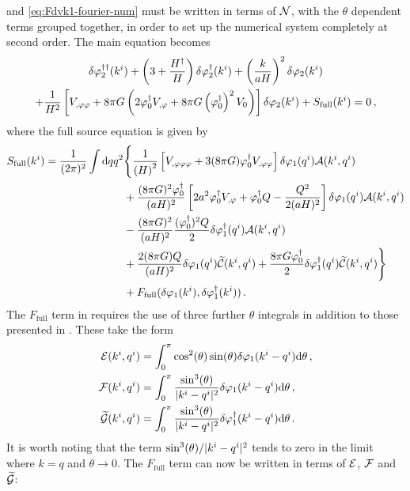  and \eqref{eq:Fdvk1-fourier-num} must be written in
terms of $\mathcal{N}$, with the $\theta$ dependent terms grouped together, in order to set
up the numerical system completely at second order. 
The main equation
becomes
\begin{multline}
 \label{eq:fullso-res}
\ddN{\dvp2}(\kvi) + \left(3 + \frac{\dN{H}}{H}\right) \dN{\dvp2}(\kvi) +
\left(\frac{k}{aH}\right)^2 \dvp2(\kvi) \\
% 
+ \frac{1}{H^2}\left[ \Upp + 8\pi G\left(2\dN{\vp_0}\Uphi + 8\pi G
\left(\dN{\vp_0}\right)^2 \U \right)\right] \dvp2(\kvi)
% 
+ S_\mathrm{full}(\kvi) = 0\,,
\end{multline}
% 
where the full source equation is given by
% 
\begin{align}
\label{eq:fullsrc-res}
S_\mathrm{full}(\kvi) = \frac{1}{(2\pi)^2}\int \d q q^2 &\Bigg\{ 
% 
\frac{1}{\left(H\right)^2} \left[ \Uppp + 3(8\pi G)\dN{\vp_0}\Upp\right]
 \dvp1(\qvi) \A(\kvi, \qvi) \nonumber \\
% 
&+\frac{(8\pi G)^2 \dN{\vp_0}}{(aH)^2}\left[ 2a^2\dN{\vp_0}\Uphi +\dN{\vp_0}Q
-\frac{Q^2}{2(aH)^2}\right] \dvp1(\qvi) \A(\kvi, \qvi) \nonumber \\
% 
&- \frac{(8\pi G)^2}{(aH)^2}\frac{(\dN{\vp_0})^2 Q}{2} \dN{\dvp1}(\qvi)
\A(\kvi, \qvi) \nonumber \\
% 
&+ \frac{2(8\pi G)Q}{(aH)^2} \dvp1(\qvi)\wt{\C}(\kvi, \qvi) 
% 
+ \frac{8\pi G \dN{\vp_0}}{2} \dN{\dvp1}(\qvi) \wt{\C}(\kvi, \qvi) \Bigg\} \nonumber
\\
% 
&+ F_\mathrm{full}(\dvp1(\kvi), \dN{\dvp1}(\kvi))\,.
\end{align}
% 
The $F_\mathrm{full}$ term in  requires the use of three further
$\theta$
integrals in addition to those presented in . These take the form
% 
\begin{align}
\label{eq:efg-terms-res}
 \E(\kvi, \qvi) &= \int_0^\pi \cos^2(\theta) \sin(\theta) \dvp1(\kvi-\qvi)\d \theta
\,,\nonumber \\
% 
\F(\kvi, \qvi) &= \int_0^\pi \frac{\sin^3(\theta)}{|\kvi-\qvi|^2} \dvp1(\kvi-\qvi)\d
\theta \,,\nonumber \\
% 
\wt{\G}(\kvi, \qvi) &= \int_0^\pi \frac{\sin^3(\theta)}{|\kvi-\qvi|^2}
\dN{\dvp1}(\kvi-\qvi)\d \theta \,.
\end{align}
% 
It is worth noting that the term $\sin^3(\theta)/|k^i-q^i|^2$ tends to zero in the
limit where $k=q$ and
$\theta\rightarrow 0$.
% 
The $F_\mathrm{full}$ term can now be written in terms of $\mathcal{E}$, $\mathcal{F}$ and $\widetilde{\mathcal{G}}$:
